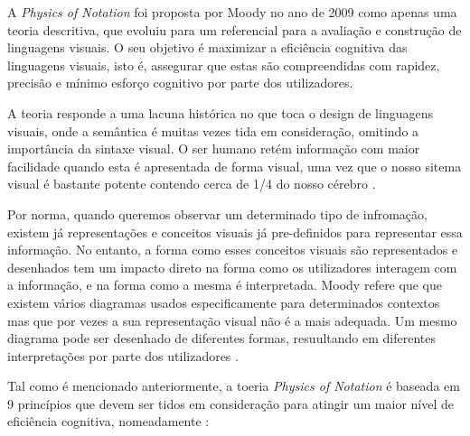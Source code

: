 
A \textit{Physics of Notation} foi proposta por Moody no ano de 2009 como apenas uma teoria descritiva, que evoluiu para um referencial para a avaliação e construção de linguagens visuais. O seu objetivo é maximizar a eficiência cognitiva das linguagens visuais, isto é, assegurar que estas são compreendidas com rapidez, precisão e mínimo esforço cognitivo por parte dos utilizadores. 

A teoria responde a uma lacuna histórica no que toca o design de linguagens visuais, onde a semântica é muitas vezes tida em consideração, omitindo a importância da sintaxe visual. O ser humano retém informação com maior facilidade quando esta é apresentada de forma visual, uma vez que o nosso sitema visual é bastante potente contendo cerca de 1/4 do nosso cérebro \cite{moody2009physics}. %

Por norma, quando queremos observar um determinado tipo de infromação, existem já representações e conceitos visuais já pre-definidos para representar essa informação. No entanto, a forma como esses conceitos visuais são representados e desenhados tem um impacto direto na forma como os utilizadores interagem com a informação, e na forma como a mesma é interpretada. Moody refere que que existem vários diagramas usados especificamente para determinados contextos mas que por vezes a sua representação visual não é a mais adequada. Um mesmo diagrama pode ser desenhado de diferentes formas, resuultando em diferentes interpretações por parte dos utilizadores \cite{moody2009physics}. 

Tal como é mencionado anteriormente, a toeria \textit{Physics of Notation} é baseada em 9 princípios que devem ser tidos em consideração para atingir um maior nível de eficiência cognitiva, nomeadamente \cite{moody2009physics}:

